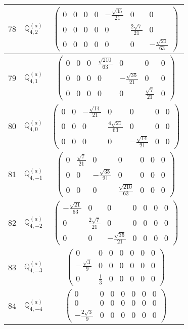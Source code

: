 \documentclass[fleqn,8pt,landscape]{jsarticle}
\begin{document}
\begin{center}
\begin{longtable}{ccc}
$ 78 $ & $ \mathbb{Q}_{4,2}^{(a)} $ & $ \begin{pmatrix} 0 & 0 & 0 & 0 & - \frac{\sqrt{35}}{21} & 0 & 0 \\ 0 & 0 & 0 & 0 & 0 & \frac{2 \sqrt{7}}{21} & 0 \\ 0 & 0 & 0 & 0 & 0 & 0 & - \frac{\sqrt{21}}{63} \end{pmatrix} $ \\ \hline
$ 79 $ & $ \mathbb{Q}_{4,1}^{(a)} $ & $ \begin{pmatrix} 0 & 0 & 0 & \frac{\sqrt{210}}{63} & 0 & 0 & 0 \\ 0 & 0 & 0 & 0 & - \frac{\sqrt{35}}{21} & 0 & 0 \\ 0 & 0 & 0 & 0 & 0 & \frac{\sqrt{7}}{21} & 0 \end{pmatrix} $ \\ \hline
$ 80 $ & $ \mathbb{Q}_{4,0}^{(a)} $ & $ \begin{pmatrix} 0 & 0 & - \frac{\sqrt{14}}{21} & 0 & 0 & 0 & 0 \\ 0 & 0 & 0 & \frac{4 \sqrt{21}}{63} & 0 & 0 & 0 \\ 0 & 0 & 0 & 0 & - \frac{\sqrt{14}}{21} & 0 & 0 \end{pmatrix} $ \\ \hline
$ 81 $ & $ \mathbb{Q}_{4,-1}^{(a)} $ & $ \begin{pmatrix} 0 & \frac{\sqrt{7}}{21} & 0 & 0 & 0 & 0 & 0 \\ 0 & 0 & - \frac{\sqrt{35}}{21} & 0 & 0 & 0 & 0 \\ 0 & 0 & 0 & \frac{\sqrt{210}}{63} & 0 & 0 & 0 \end{pmatrix} $ \\ \hline
$ 82 $ & $ \mathbb{Q}_{4,-2}^{(a)} $ & $ \begin{pmatrix} - \frac{\sqrt{21}}{63} & 0 & 0 & 0 & 0 & 0 & 0 \\ 0 & \frac{2 \sqrt{7}}{21} & 0 & 0 & 0 & 0 & 0 \\ 0 & 0 & - \frac{\sqrt{35}}{21} & 0 & 0 & 0 & 0 \end{pmatrix} $ \\ \hline
$ 83 $ & $ \mathbb{Q}_{4,-3}^{(a)} $ & $ \begin{pmatrix} 0 & 0 & 0 & 0 & 0 & 0 & 0 \\ - \frac{\sqrt{3}}{9} & 0 & 0 & 0 & 0 & 0 & 0 \\ 0 & \frac{1}{3} & 0 & 0 & 0 & 0 & 0 \end{pmatrix} $ \\ \hline
$ 84 $ & $ \mathbb{Q}_{4,-4}^{(a)} $ & $ \begin{pmatrix} 0 & 0 & 0 & 0 & 0 & 0 & 0 \\ 0 & 0 & 0 & 0 & 0 & 0 & 0 \\ - \frac{2 \sqrt{3}}{9} & 0 & 0 & 0 & 0 & 0 & 0 \end{pmatrix} $ \\ \hline

\end{longtable}
\end{center}
\end{document}
